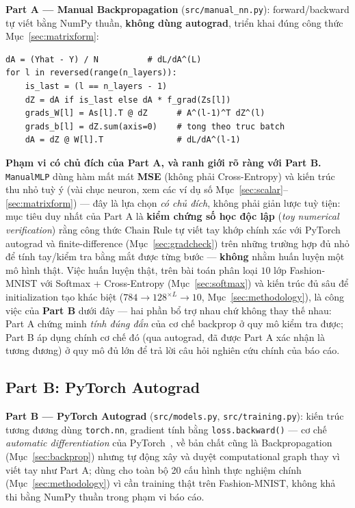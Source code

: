 \documentclass[12pt,a4paper]{article}
\newcommand{\en}[1]{\textit{#1}}
\begin{document}
\textbf{Part A --- Manual Backpropagation} (\texttt{src/manual\_nn.py}):
forward/backward tự viết bằng NumPy thuần, \textbf{không dùng autograd},
triển khai đúng công thức Mục~\ref{sec:matrixform}:

\begin{lstlisting}[caption={Backward pass thủ công (trích từ src/manual\_nn.py)}]
dA = (Yhat - Y) / N          # dL/dA^(L)
for l in reversed(range(n_layers)):
    is_last = (l == n_layers - 1)
    dZ = dA if is_last else dA * f_grad(Zs[l])
    grads_W[l] = As[l].T @ dZ      # A^(l-1)^T dZ^(l)
    grads_b[l] = dZ.sum(axis=0)    # tong theo truc batch
    dA = dZ @ W[l].T               # dL/dA^(l-1)
\end{lstlisting}

\textbf{Phạm vi có chủ đích của Part A, và ranh giới rõ ràng với Part B.}
\texttt{ManualMLP} dùng hàm mất mát \textbf{MSE} (không phải
Cross-Entropy) và kiến trúc thu nhỏ tuỳ ý (vài chục neuron, xem các ví dụ
số Mục~\ref{sec:scalar}--\ref{sec:matrixform}) --- đây là lựa chọn
\emph{có chủ đích}, không phải giản lược tuỳ tiện: mục tiêu duy nhất của
Part A là \textbf{kiểm chứng số học độc lập} (\en{toy numerical
verification}) rằng công thức Chain Rule tự viết tay khớp chính xác với
PyTorch autograd và finite-difference (Mục~\ref{sec:gradcheck}) trên
những trường hợp đủ nhỏ để tính tay/kiểm tra bằng mắt được từng bước ---
\textbf{không} nhằm huấn luyện một mô hình thật. Việc huấn luyện thật,
trên bài toán phân loại $10$ lớp Fashion-MNIST với Softmax + Cross-Entropy
(Mục~\ref{sec:softmax}) và kiến trúc đủ sâu để initialization tạo khác
biệt ($784\to128^{\times L}\to10$, Mục~\ref{sec:methodology}), là công
việc của \textbf{Part B} dưới đây --- hai phần bổ trợ nhau chứ không thay
thế nhau: Part A chứng minh \emph{tính đúng đắn} của cơ chế backprop ở
quy mô kiểm tra được; Part B áp dụng chính cơ chế đó (qua autograd, đã
được Part A xác nhận là tương đương) ở quy mô đủ lớn để trả lời câu hỏi
nghiên cứu chính của báo cáo.

\subsection{Part B: PyTorch Autograd}

\textbf{Part B --- PyTorch Autograd} (\texttt{src/models.py},
\texttt{src/training.py}): kiến trúc tương đương dùng \texttt{torch.nn},
gradient tính bằng \texttt{loss.backward()} --- cơ chế \en{automatic
differentiation} của PyTorch~\citep{paszke2019pytorch}, về bản chất cũng
là Backpropagation (Mục~\ref{sec:backprop}) nhưng tự động xây và duyệt
computational graph thay vì viết tay như Part A; dùng cho toàn bộ 20 cấu
hình thực nghiệm chính (Mục~\ref{sec:methodology}) vì cần training thật
trên Fashion-MNIST, không khả thi bằng NumPy thuần trong phạm vi báo cáo.
\end{document}
